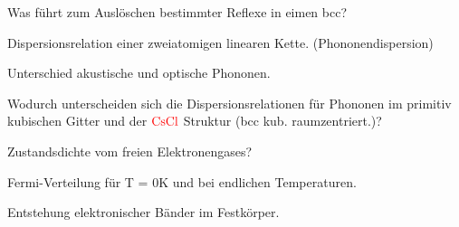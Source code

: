 \documentclass[a5paper,12pt,ngerman,print,grid=front]{kartei}
\let\oldce\ce
\renewcommand*{\ce}[1]{\begingroup\color{red}\oldce{#1}\endgroup}
\begin{document}
	\begin{karte}{
		Was führt zum Auslöschen bestimmter Reflexe in eimen bcc?
		}
		
		
		
	\end{karte}


	\begin{karte}{
		Dispersionsrelation einer zweiatomigen linearen Kette. (Phononendispersion)
		}
		
		
		
	\end{karte}


	\begin{karte}{
		Unterschied akustische und optische Phononen.
		}
		
		
		
	\end{karte}


	\begin{karte}{
		Wodurch unterscheiden sich die Dispersionsrelationen für Phononen im primitiv 
		kubischen Gitter und der $\ce{CsCl}$ Struktur (bcc kub. raumzentriert.)?
		}
		
		
		
	\end{karte}


	\begin{karte}{
		Zustandsdichte vom freien Elektronengases?
		}
		
		
		
	\end{karte}


	\begin{karte}{
		Fermi-Verteilung für T = 0K und bei endlichen Temperaturen.
		}
		
		
		
	\end{karte}


	\begin{karte}{
		Entstehung elektronischer Bänder im Festkörper.
		}
		
		
		
	\end{karte}
\end{document}
